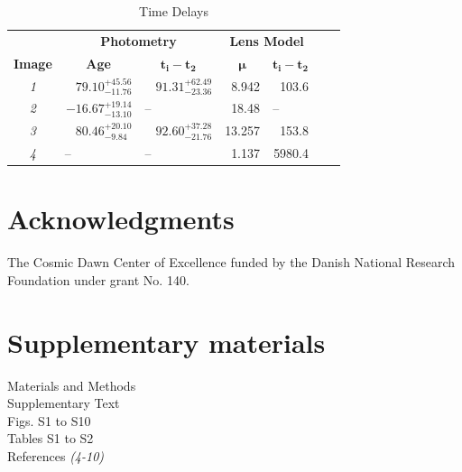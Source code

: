 \documentclass[12pt,dvipsnames]{article}
\begin{document}
\begin{table}
\centering
\begin{tabular}{crr|rrrr}
    \multicolumn{1}{c}{}&
    \multicolumn{2}{c}{\textbf{Photometry}}&\multicolumn{2}{c}{\textbf{Lens Model}}\\
    \multicolumn{1}{c}{\textbf{Image}} &\multicolumn{1}{c}{\textbf{Age}} &\multicolumn{1}{c}{$\mathbf{t_i-t_2}$}&\multicolumn{1}{c}{$\mathbf{\mu}$}
    &\multicolumn{1}{c}{$\mathbf{t_i-t_2}$}\\
    
\midrule

\textit{1}  &$79.10^{+45.56}_{-11.76}$&$91.31^{+62.49}_{-23.36}$ &8.942&103.6\\
\textit{2} & $-16.67^{+19.14}_{-13.10}$&-- \ \ \ \ \ \ \ \ \  & 18.48&-- \ \ \ \ \\
\textit{3} &$80.46^{+20.10}_{-9.84}$&$92.60^{+37.28}_{-21.76}$ & 13.257&153.8\\
\textit{4} &-- \ \ \ \ \ \ \ \ \ &-- \ \ \ \ \ \ \ \ \ &1.137&5980.4\\


\end{tabular}
\caption{\label{tab:time_delays}Time Delays}
\end{table}









\section*{Acknowledgments}

The Cosmic Dawn Center of Excellence funded by the Danish National Research Foundation under grant No. 140.


\clearpage
\section*{Supplementary materials}
Materials and Methods\\
Supplementary Text\\
Figs. S1 to S10\\
Tables S1 to S2\\
References \textit{(4-10)}
\clearpage
\setcounter{table}{0}
\renewcommand{\thetable}{S\arabic{table}}
\end{document}

